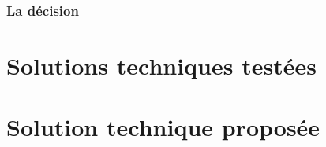 \subsubsection{La décision}
\label{Automatisation du processus d'investigation: Achitecture High Level du système proposé: La décision}



\section{Solutions techniques testées}
\label{Automatisation du processus d'investigation: Solutions techniques testées}




\section{Solution technique proposée}
\label{Automatisation du processus d'investigation: Solution technique proposée}

